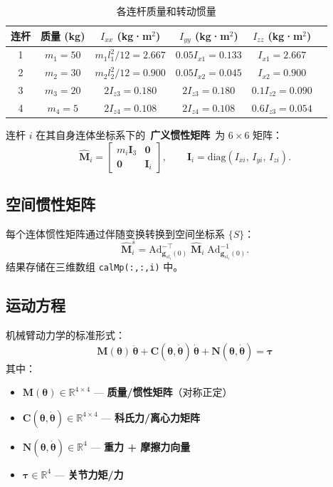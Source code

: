 \documentclass[12pt,a4paper]{ctexart}
\begin{document}
\begin{table}[H]
\centering
\caption{各连杆质量和转动惯量}
\begin{tabular}{cccccc}
\toprule
连杆 & 质量 (kg) & $I_{xx}$ (kg·m$^2$) & $I_{yy}$ (kg·m$^2$) & $I_{zz}$ (kg·m$^2$) \\
\midrule
1 & $m_1 = 50$   & $m_1 l_1^2/12 = 2.667$ & $0.05 I_{x1}=0.133$ & $I_{x1}=2.667$ \\
2 & $m_2 = 30$   & $m_2 l_2^2/12 = 0.900$ & $0.05 I_{x2}=0.045$ & $I_{x2}=0.900$ \\
3 & $m_3 = 20$   & $2 I_{z3} = 0.180$     & $2 I_{z3} = 0.180$   & $0.1 I_{z2}=0.090$ \\
4 & $m_4 = 5$    & $2 I_{z4} = 0.108$     & $2 I_{z4} = 0.108$   & $0.6 I_{z3}=0.054$ \\
\bottomrule
\end{tabular}
\end{table}

连杆 $i$ 在其自身连体坐标系下的\ \textbf{广义惯性矩阵}\ 为 $6\times 6$ 矩阵：
\[
\hat{\mathbf{M}}_i = \begin{bmatrix}
m_i\mathbf{I}_3 & \mathbf{0} \\
\mathbf{0} & \mathbf{I}_i
\end{bmatrix},\qquad \mathbf{I}_i = \mathrm{diag}(I_{xi},\,I_{yi},\,I_{zi}).
\]

\subsection{空间惯性矩阵}

每个连体惯性矩阵通过伴随变换转换到空间坐标系 $\{S\}$：
\[
\hat{\mathbf{M}}_i^s = \mathrm{Ad}_{\mathbf{g}_{sl_i}(0)}^{-\top}\;\hat{\mathbf{M}}_i\;
\mathrm{Ad}_{\mathbf{g}_{sl_i}(0)}^{-1}.
\]
结果存储在三维数组 \texttt{calMp(:,:,i)} 中。

\subsection{运动方程}

机械臂动力学的标准形式：
\[
\boxed{\mathbf{M}(\bm{\theta})\,\ddot{\bm{\theta}} + \mathbf{C}(\bm{\theta},\dot{\bm{\theta}})\,\dot{\bm{\theta}} + \mathbf{N}(\bm{\theta},\dot{\bm{\theta}}) = \bm{\tau}}
\]
其中：
\begin{itemize}
  \item $\mathbf{M}(\bm{\theta}) \in \mathbb{R}^{4\times 4}$ --- \textbf{质量/惯性矩阵}（对称正定）
  \item $\mathbf{C}(\bm{\theta},\dot{\bm{\theta}}) \in \mathbb{R}^{4\times 4}$ --- \textbf{科氏力/离心力矩阵}
  \item $\mathbf{N}(\bm{\theta},\dot{\bm{\theta}}) \in \mathbb{R}^{4}$ --- \textbf{重力 + 摩擦力向量}
  \item $\bm{\tau} \in \mathbb{R}^{4}$ --- \textbf{关节力矩/力}
\end{itemize}
\end{document}
